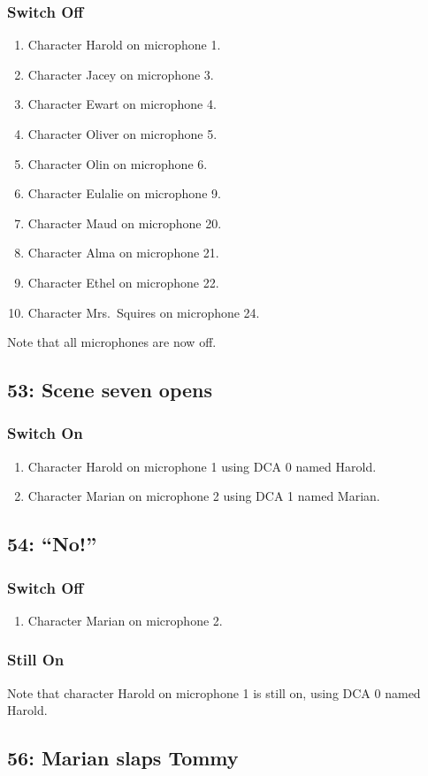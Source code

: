 \subsubsection* {Switch Off}
\begin{enumerate}
\item Character Harold on microphone 1.
\item Character Jacey on microphone 3.
\item Character Ewart on microphone 4.
\item Character Oliver on microphone 5.
\item Character Olin on microphone 6.
\item Character Eulalie on microphone 9.
\item Character Maud on microphone 20.
\item Character Alma on microphone 21.
\item Character Ethel on microphone 22.
\item Character Mrs.~Squires on microphone 24.
\end{enumerate}
Note that all microphones are now off.
\subsection* {53: Scene seven opens}
\subsubsection* {Switch On}
\begin{enumerate}
\item Character Harold on microphone 1 using DCA 0 named Harold.
\item Character Marian on microphone 2 using DCA 1 named Marian.
\end{enumerate}
\subsection* {54: ``No!''}
\subsubsection* {Switch Off}
\begin{enumerate}
\item Character Marian on microphone 2.
\end{enumerate}
\subsubsection* {Still On}
Note that character Harold on microphone 1 is still on, using DCA 0 named Harold.\subsection* {56: Marian slaps Tommy}
